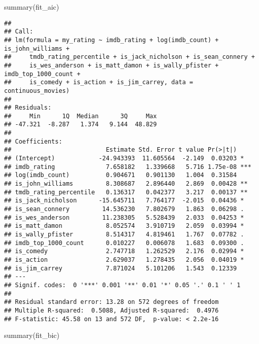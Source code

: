 \documentclass[
]{article}
\newenvironment{Shaded}{\begin{snugshade}}{\end{snugshade}}
\newcommand{\FunctionTok}[1]{\textcolor[rgb]{0.00,0.00,0.00}{#1}}
\newcommand{\NormalTok}[1]{#1}
\begin{document}
\begin{Shaded}
\begin{Highlighting}[]
\FunctionTok{summary}\NormalTok{(fit\_aic)}
\end{Highlighting}
\end{Shaded}

\begin{verbatim}
## 
## Call:
## lm(formula = my_rating ~ imdb_rating + log(imdb_count) + is_john_williams + 
##     tmdb_rating_percentile + is_jack_nicholson + is_sean_connery + 
##     is_wes_anderson + is_matt_damon + is_wally_pfister + imdb_top_1000_count + 
##     is_comedy + is_action + is_jim_carrey, data = continuous_movies)
## 
## Residuals:
##     Min      1Q  Median      3Q     Max 
## -47.321  -8.287   1.374   9.144  48.829 
## 
## Coefficients:
##                          Estimate Std. Error t value Pr(>|t|)    
## (Intercept)            -24.943393  11.605564  -2.149  0.03203 *  
## imdb_rating              7.658182   1.339668   5.716 1.75e-08 ***
## log(imdb_count)          0.904671   0.901130   1.004  0.31584    
## is_john_williams         8.308687   2.896440   2.869  0.00428 ** 
## tmdb_rating_percentile   0.136317   0.042377   3.217  0.00137 ** 
## is_jack_nicholson      -15.645711   7.764177  -2.015  0.04436 *  
## is_sean_connery         14.536230   7.802679   1.863  0.06298 .  
## is_wes_anderson         11.238305   5.528439   2.033  0.04253 *  
## is_matt_damon            8.052574   3.910719   2.059  0.03994 *  
## is_wally_pfister         8.514317   4.819461   1.767  0.07782 .  
## imdb_top_1000_count      0.010227   0.006078   1.683  0.09300 .  
## is_comedy                2.747718   1.262529   2.176  0.02994 *  
## is_action                2.629037   1.278435   2.056  0.04019 *  
## is_jim_carrey            7.871024   5.101206   1.543  0.12339    
## ---
## Signif. codes:  0 '***' 0.001 '**' 0.01 '*' 0.05 '.' 0.1 ' ' 1
## 
## Residual standard error: 13.28 on 572 degrees of freedom
## Multiple R-squared:  0.5088, Adjusted R-squared:  0.4976 
## F-statistic: 45.58 on 13 and 572 DF,  p-value: < 2.2e-16
\end{verbatim}

\begin{Shaded}
\begin{Highlighting}[]
\FunctionTok{summary}\NormalTok{(fit\_bic)}
\end{Highlighting}
\end{Shaded}
\end{document}
